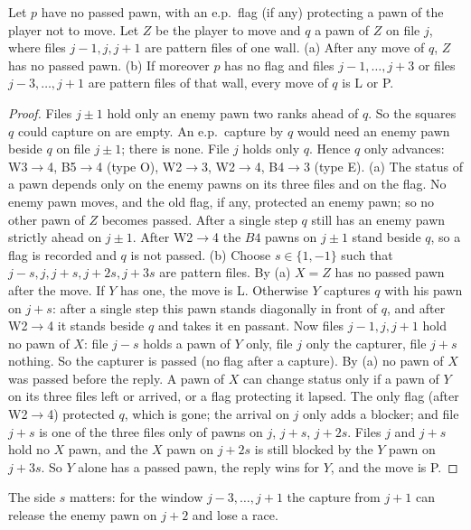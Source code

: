 \begin{wallproof}
\begin{lemma}
Let $p$ have no passed pawn, with an e.p.\ flag (if any) protecting a pawn of the player not to move. Let $Z$ be the player to move and
$q$ a pawn of $Z$ on file $j$, where files $j-1,j,j+1$ are pattern files of one wall.
(a) After any move of $q$, $Z$ has no passed pawn.
(b) If moreover $p$ has no flag and files $j-1,\dots,j+3$ or files $j-3,\dots,j+1$ are pattern files of that wall, every move of $q$ is
L or P.
\end{lemma}
\begin{proof}
Files $j\pm1$ hold only an enemy pawn two ranks ahead of $q$. So the squares $q$ could capture on are empty. An e.p.\ capture by $q$
would need an enemy pawn beside $q$ on file $j\pm1$; there is none. File $j$ holds only $q$. Hence $q$ only advances: W3$\to$4, B5$\to$4 (type O),
W2$\to$3, W2$\to$4, B4$\to$3 (type E).
(a) The status of a pawn depends only on the enemy pawns on its three files and on the flag. No enemy pawn moves, and the old flag,
if any, protected an enemy pawn; so no other pawn of $Z$ becomes passed. After a single step $q$ still has an enemy pawn strictly
ahead on $j\pm1$. After W2$\to$4 the $B4$ pawns on $j\pm1$ stand beside $q$, so a flag is recorded and $q$ is not passed.
(b) Choose $s\in\{1,-1\}$ such that $j-s,j,j+s,j+2s,j+3s$ are pattern files. By (a) $X=Z$ has no passed pawn after the move. If $Y$
has one, the move is L. Otherwise $Y$ captures $q$ with his pawn on $j+s$: after a single step this pawn stands diagonally in front of $q$, and after
W2$\to$4 it stands beside $q$ and takes it en passant. Now files $j-1,j,j+1$ hold no pawn of $X$: file $j-s$ holds a pawn of $Y$ only, file
$j$ only the capturer, file $j+s$ nothing. So the capturer is passed (no flag after a capture). By (a) no pawn of $X$ was passed before the reply. A pawn of $X$ can change status only if a pawn of $Y$ on its three files left or
arrived, or a flag protecting it lapsed. The only flag (after W2$\to$4) protected $q$, which is gone; the arrival on $j$ only adds a
blocker; and file $j+s$ is one of the three files only of pawns on $j$, $j+s$, $j+2s$. Files $j$ and $j+s$ hold no $X$ pawn, and the
$X$ pawn on $j+2s$ is still blocked by the $Y$ pawn on $j+3s$. So $Y$ alone has a passed pawn, the reply wins for $Y$, and the move is P.
\end{proof}
The side $s$ matters: for the window $j-3,\dots,j+1$ the capture from $j+1$ can release the enemy pawn on $j+2$ and lose a race.


\end{wallproof}

